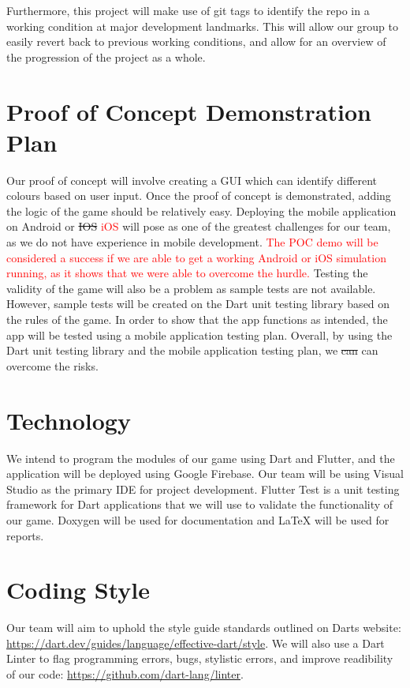 \documentclass{article}
\begin{document}
Furthermore, this project will make use of git tags to identify the repo in a working condition at major development landmarks. This will allow our group to easily revert back to previous working conditions, and allow for an overview of the progression of the project as a whole.


\section{Proof of Concept Demonstration Plan}
Our proof of concept will involve creating a GUI which can identify different colours based on user input. Once the proof of concept is demonstrated, adding the logic of the game should be relatively easy. Deploying the mobile application on Android or \sout{IOS} \textcolor{red}{iOS} will pose as one of the greatest challenges for our team, as we do not have experience in mobile development. \textcolor{red}{The POC demo will be considered a success if we are able to get a working Android or iOS simulation running, as it shows that we were able to overcome the hurdle.} Testing the validity of the game will also be a problem as sample tests are not available. However, sample tests will be created on the Dart unit testing library based on the rules of the game. In order to show that the app functions as intended, the app will be tested using a mobile application testing plan. Overall, by using the Dart unit testing library and the mobile application testing plan, we \sout{can} can overcome the risks.

\section{Technology}

We intend to program the modules of our game using Dart and Flutter, and the application will be deployed using Google Firebase. Our team will be using Visual Studio as the primary IDE for project development. Flutter Test is a unit testing framework for Dart applications that we will use to validate the functionality of our game. Doxygen will be used for documentation and LaTeX will be used for reports.

\section{Coding Style}

Our team will aim to uphold the style guide standards outlined on Darts website: \url{https://dart.dev/guides/language/effective-dart/style}. We will also use a Dart Linter to flag programming errors, bugs, stylistic errors, and improve readibility of our code: \url{https://github.com/dart-lang/linter}.
\end{document}
